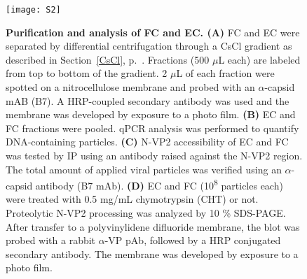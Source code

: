 \begin{figure}[t]
\centering
\texttt{[image: S2]} \\[0.3cm]
\caption[Purification and Analysis of Full Capsids and Empty Capsids]
{\textbf{Purification and analysis of FC and EC. (A)} FC and EC were separated by differential centrifugation through a CsCl gradient as described in Section~\ref{CsCl}, p.~\pageref{CsCl}. Fractions (500 $\mu$L each) are labeled from top to bottom of the gradient. 2 $\mu$L of each fraction were spotted on a nitrocellulose membrane and probed with an $\alpha$-capsid mAB (B7). A HRP-coupled secondary antibody was used and the membrane was developed by exposure to a photo film. \textbf{(B)} EC and FC fractions were pooled. qPCR analysis was performed to quantify DNA-containing particles. \textbf{(C)} N-VP2 accessibility of EC and FC was tested by IP using an antibody raised against the N-VP2 region. The total amount of applied viral particles was verified using an $\alpha$-capsid antibody (B7 mAb). \textbf{(D)} EC and FC (10\textsuperscript{8} particles each) were treated with 0.5 mg/mL chymotrypsin (CHT) or not. Proteolytic N-VP2 processing was analyzed by 10 \% SDS-PAGE. After transfer to a polyvinylidene difluoride membrane, the blot was probed with a rabbit $\alpha$-VP pAb, followed by a HRP conjugated secondary antibody. The membrane was developed by exposure to a photo film.} 
\label{S2}
\end{figure}

\vspace{1.5cm}

